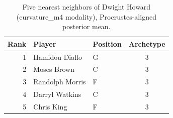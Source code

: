 \begin{table}[htbp]
  \centering\small
  \begin{tabular}{rllc}
    \toprule
    Rank & Player & Position & Archetype \\
    \midrule
    1 & Hamidou Diallo & G & 3 \\
    2 & Moses Brown & C & 3 \\
    3 & Randolph Morris & F & 3 \\
    4 & Darryl Watkins & C & 3 \\
    5 & Chris King & F & 3 \\
    \bottomrule
  \end{tabular}
  \caption{Five nearest neighbors of Dwight Howard (curvature_m4 modality), Procrustes-aligned posterior mean.}
  \label{tab:Dwight_Howard_neighbors_curvature_m4}
\end{table}


